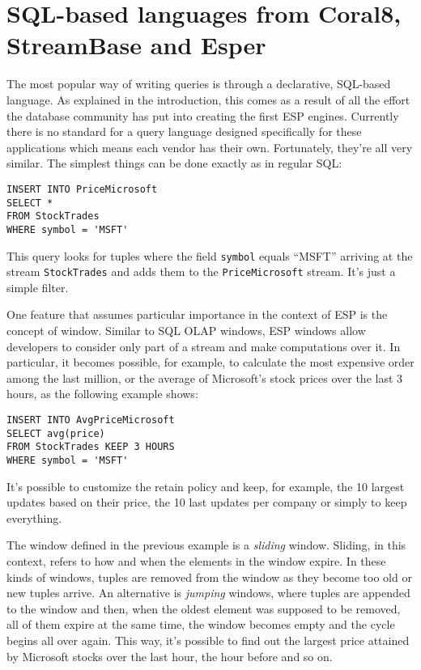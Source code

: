 \documentclass{report}
\begin{document}
\section{SQL-based languages from Coral8, StreamBase and Esper}

The most popular way of writing queries is through a declarative, SQL-based language. As explained in the introduction, this comes as a result of all the effort the database community has put into creating the first ESP engines. Currently there is no standard for a query language designed specifically for these applications which means each vendor has their own. Fortunately, they're all very similar. The simplest things can be done exactly as in regular SQL:

\begin{verbatim}
INSERT INTO PriceMicrosoft
SELECT *
FROM StockTrades
WHERE symbol = 'MSFT'
\end{verbatim}

This query looks for tuples where the field \verb=symbol= equals ``MSFT'' arriving at the stream \verb=StockTrades= and adds them to the \verb=PriceMicrosoft= stream. It's just a simple filter.

One feature that assumes particular importance in the context of ESP is the concept of window. Similar to SQL OLAP windows, ESP windows allow developers to consider only part of a stream and make computations over it. In particular, it becomes possible, for example, to calculate the most expensive order among the last million, or the average of Microsoft's stock prices over the last 3 hours, as the following example shows:

\begin{verbatim}
INSERT INTO AvgPriceMicrosoft
SELECT avg(price)
FROM StockTrades KEEP 3 HOURS
WHERE symbol = 'MSFT'
\end{verbatim}

It's possible to customize the retain policy and keep, for example, the 10 largest updates based on their price, the 10 last updates per company or simply to keep everything.

The window defined in the previous example is a \emph{sliding} window. Sliding, in this context, refers to how and when the elements in the window expire. In these kinds of windows, tuples are removed from the window as they become too old or new tuples arrive. An alternative is \emph{jumping} windows, where tuples are appended to the window and then, when the oldest element was supposed to be removed, all of them expire at the same time, the window becomes empty and the cycle begins all over again. This way, it's possible to find out the largest price attained by Microsoft stocks over the last hour, the hour before and so on.
\end{document}
